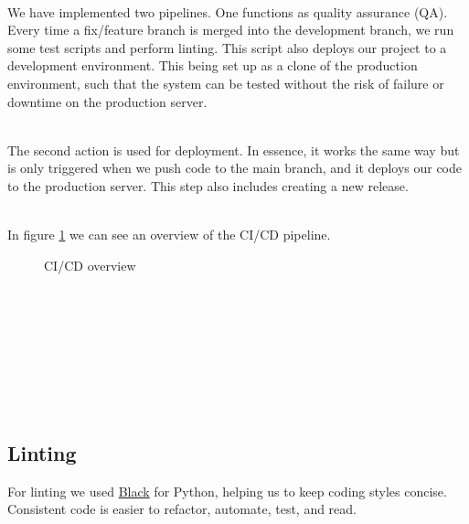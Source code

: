 \documentclass[11pt]{article}
\begin{document}
\ \\
\noindent
We have implemented two pipelines. One functions as quality assurance (QA). Every time a fix/feature branch is merged into the development branch, we run some test scripts and perform linting. This script also deploys our project to a development environment. This being set up as a clone of the production environment, such that the system can be tested without the risk of failure or downtime on the production server.

\ \\
\noindent
The second action is used for deployment. In essence, it works the same way but is only triggered when we push code to the main branch, and it deploys our code to the production server. This step also includes creating a new release.

\ \\
\noindent
In figure \ref{fig:cicd_overview} we can see an overview of the CI/CD pipeline.

\begin{figure}[]
    \centering
    \caption{CI/CD overview}
    \label{fig:cicd_overview}
\end{figure}

\ \\ \\ \\ \\ \\ \\ \\

\subsection{Linting}
For linting we used \href{https://github.com/psf/black}{Black} for Python, helping us to keep coding styles concise. Consistent code is easier to refactor, automate, test, and read.
\end{document}
